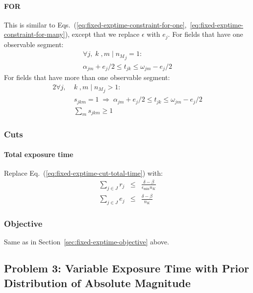 \documentclass[twocolumn,times]{aastex631}
\begin{document}
\paragraph{\ac{FOR}}
This is similar to Eqs.~(\ref{eq:fixed-exptime-constraint-for-one},~\ref{eq:fixed-exptime-constraint-for-many}), except that we replace $\epsilon$ with $e_j$. For fields that have one observable segment:
%
\begin{multline}
    \label{eq:variable-exptime-constraint-for-one}
    \forall j ,\; k \;, m \mid {n_M}_j = 1 : \\ \alpha_{jm} + e_j / 2 \leq t_{jk} \leq \omega_{jm} - e_j / 2
\end{multline}
%
For fields that have more than one observable segment:
%
\begin{alignat}{2}
    \label{eq:variable-exptime-constraint-for-many}
    \forall j ,\; &k \;, m \mid {n_M}_j > 1 : \nonumber \\
    &s_{jkm} = 1 \;\Rightarrow\; \alpha_{jm} + e_j / 2 \leq t_{jk} \leq \omega_{jm} - e_j / 2 \\
    &\sum_m s_{jkm} \geq 1
\end{alignat}

\subsubsection{Cuts}

\paragraph{Total exposure time}
Replace Eq.~(\ref{eq:fixed-exptime-cut-total-time}) with:
%
\begin{eqnarray}
    \label{eq:variable-exptime-cut-total-time}
    \sum_{j \in J} r_j &\leq& \frac{\delta - \beta}{\epsilon_\mathrm{min} n_K} \\
    \sum_{j \in J} e_j &\leq& \frac{\delta - \beta}{n_K}
\end{eqnarray}

\subsubsection{Objective}

Same as in Section~\ref{sec:fixed-exptime-objective} above.

\subsection{Problem 3: Variable Exposure Time with Prior Distribution of Absolute Magnitude}
\label{sec:absmag-distn}
\end{document}
